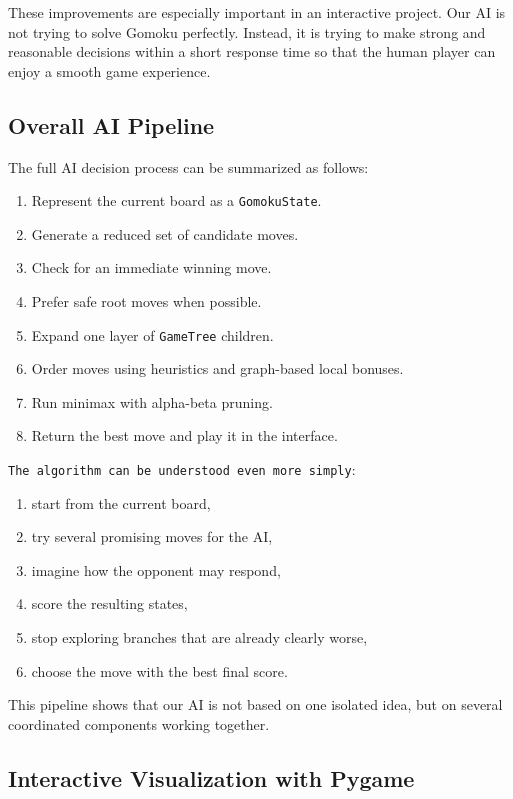 \documentclass[11pt]{article}
\begin{document}
These improvements are especially important in an interactive project. Our AI is not trying to solve Gomoku perfectly. Instead, it is trying to make strong and reasonable decisions within a short response time so that the human player can enjoy a smooth game experience.

\subsection*{Overall AI Pipeline}

The full AI decision process can be summarized as follows:

\begin{enumerate}
    \item Represent the current board as a \texttt{GomokuState}.
    \item Generate a reduced set of candidate moves.
    \item Check for an immediate winning move.
    \item Prefer safe root moves when possible.
    \item Expand one layer of \texttt{GameTree} children.
    \item Order moves using heuristics and graph-based local bonuses.
    \item Run minimax with alpha-beta pruning.
    \item Return the best move and play it in the interface.
\end{enumerate}

\texttt{The algorithm can be understood even more simply}:
\begin{enumerate}
    \item start from the current board,
    \item try several promising moves for the AI,
    \item imagine how the opponent may respond,
    \item score the resulting states,
    \item stop exploring branches that are already clearly worse,
    \item choose the move with the best final score.
\end{enumerate}

This pipeline shows that our AI is not based on one isolated idea, but on several coordinated components working together.

\subsection*{Interactive Visualization with Pygame}
\end{document}
